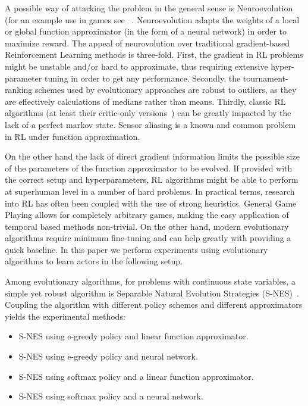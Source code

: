 \documentclass[conference]{IEEEtran}
\newenvironment{mitems}
{\begin{itemize}
\setlength{\itemsep}{1pt}
\setlength{\parskip}{0pt}
\setlength{\parsep}{0pt}}{\end{itemize}}
\begin{document}
A possible way of attacking the problem in the general sense is Neuroevolution (for an example use in games see ~\cite{stanley2005real}. Neuroevolution adapts the weights of a local or global function approximator (in the form of a neural network) in order to maximize reward. The appeal of neurovolution over traditional gradient-based Reinforcement Learning methods is three-fold. First, the gradient in RL problems might be unstable and/or hard to approximate, thus requiring extensive hyper-parameter tuning in order to get any performance. Secondly, the tournament-ranking schemes used by evolutionary approaches are robust to outliers, as they are effectively calculations of medians rather than means. Thirdly, classic RL algorithms (at least their critic-only versions~\cite{singh1994learning}) can be greatly impacted by the lack of a perfect markov state. Sensor aliasing is a known and common problem in RL under function approximation. 

On the other hand the lack of direct gradient information limits the possible size of the parameters of the function approximator to be evolved. If provided with the correct setup and hyperparameters, RL algorithms might be able to perform at superhuman level in a number of hard problems. In practical terms, research into RL has often been coupled with the use of strong heuristics. General Game Playing allows for completely arbitrary games, making the easy application of temporal based methods non-trivial. On the other hand, modern evolutionary algorithms require minimum fine-tuning and can help greatly with providing a quick baseline. In this paper we perform experiments using evolutionary algorithms to learn actors in the following setup. 

Among evolutionary algorithms, for problems with continuous state variables,  a simple yet robust algorithm is Separable Natural Evolution Strategies (S-NES)~\cite{schaul2011high}. Coupling the algorithm with different policy schemes and different approximators yields the experimental methods: 

\begin{mitems}
\item S-NES using e-greedy policy and linear function approximator. 
\item S-NES using e-greedy policy and neural network.
\item S-NES using softmax policy and a linear function approximator.
\item S-NES using softmax policy and a neural network.
\end{mitems}
\end{document}
